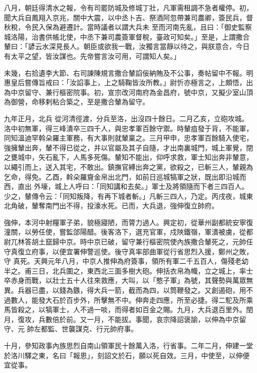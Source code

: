 \begin{pinyinscope}
 八月，朝廷得清水之報，令有司罷防城及修城丁壯，凡軍需租調不急者權停。初，聞大兵自鳳翔入京兆，關中大震，以中丞卜吉、祭酒阿忽帶兼司農卿，簽民兵，督秋稅，令民入保為避遷計。當時議者以謂大兵未
 至而河南先亂，且曰：「御史監察城洛陽，治書供帳北使，中丞下兼司農簽軍督稅，臺政可知矣。」至是，上謂撒合輦曰：「諺云水深見長人。朝臣或欲我一戰，汝獨言當靜以待之，與朕意合，今日有太平之望，皆汝謀也。先帝嘗言汝可用，可謂知人矣。」



 未幾，右拾遺李大節、右司諫陳規言撒合輦諂佞納賄及不公事，奏帖留中不報。明惠皇后嘗傳旨戒曰：「汝諂事上，上之騎鞠皆汝所教。」尉忻亦極言之，上頗悟，出為中京留守、兼行樞密院事。初，宣宗改河南府為金昌府，號中京，又擬少室山頂為御營，命移剌粘合築之，至是撒合輦為留守。



 九年正月，北兵
 從河清徑渡，分兵至洛，出沒四十餘日。二月乙亥，立砲攻城。洛中初無軍，得三峰潰卒三四千人，與忠孝軍百餘守禦。時輦疽發于背，不能軍，同知溫迪罕斡朵羅主軍務，有大事則就輦稟之。三月甲申，忠孝軍百餘騎入使宅，強擁輦出奔，輦不得已從之，并以官屬及其子自隨，才出南裏城門，城上軍覺，閉之甕城中，矢石亂下，人馬多死傷。輦知不能出，仰呼求救，軍士知出奔非輦意，以繩引而上，送入其宅，不敢出。鎮撫官縛出奔之黨，欲殺之，已斬三人，輦親為乞命，得免。乙酉，斡朵羅齎金帛出北門，如前日巡城犒軍之狀，既出即沿城而西，直出
 外壕，城上人呼曰：「同知講和去矣。」軍士及將領隨而下者三四百人。少之，輦傳令云：「同知叛降，有再下城者斬。」凡斬三四人，乃定。丙戌夜，城東北角破，輦奪南門出不得，投濠水死。已而，大兵退，強伸復立帥府。



 強伸，本河中射糧軍子弟，貌極寢陋，而膂力過人。興定初，從華州副都統安寧復潼關，以勞任使，嘗監郃陽醋。後客洛下，選充官軍，戍陜鐵嶺，軍潰被虜，從都尉兀林答胡土竄歸中京。時中京已破，留守兼行樞密院使內族撒合輦死之，元帥任守真復立府事，以便宜署伸警巡使。後守真率部曲軍從行省思烈入援，鄭州之敗，守
 真死。天興元年八月，中京人推伸為府簽事，領所有軍二千五百人，傷殘老幼半之。甫三日，北兵圍之，東西北三面多樹大砲。伸括衣帛為幟，立之城上，率士卒赤身而戰，以壯士五十人往來救應，大叫，以「憨子軍」為號，其聲勢與萬眾無異。兵器已盡，以錢為鏃，得大兵一箭，截而為四，以筒鞭發之。又創遏砲，用不過數人，能發大石於百步外，所擊無不中。伸奔走四應，所至必捷。得二駝及所乘馬皆殺之，以犒軍士，人不過一啖，而得者如百金之賜。九月，大兵退百里外。閏月，復攻，兵數倍於前。又一月，不能拔。事聞，哀宗降詔褒諭，以伸為中京留守、元
 帥左都監、世襲謀克、行元帥府事。



 十月，參知政事內族思烈自南山領軍民十餘萬入洛，行省事。二年二月，伸建一堂於洛川驛之東，名曰「報恩」，刻詔文於石，願以死自效。三月，中使至，以伸便宜從事。




\end{pinyinscope}
